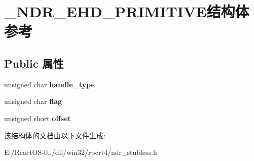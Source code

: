 \hypertarget{struct___n_d_r___e_h_d___p_r_i_m_i_t_i_v_e}{}\section{\+\_\+\+N\+D\+R\+\_\+\+E\+H\+D\+\_\+\+P\+R\+I\+M\+I\+T\+I\+V\+E结构体 参考}
\label{struct___n_d_r___e_h_d___p_r_i_m_i_t_i_v_e}
\subsection*{Public 属性}
\begin{DoxyCompactItemize}
\item 
\mbox{\label{struct___n_d_r___e_h_d___p_r_i_m_i_t_i_v_e_acfe30f4fefa57e6e75e4e15abf3e5ce1}} 
unsigned char {\bfseries handle\+\_\+type}
\item 
\mbox{\label{struct___n_d_r___e_h_d___p_r_i_m_i_t_i_v_e_ad34687e1c7d9169b174264b9da30914e}} 
unsigned char {\bfseries flag}
\item 
\mbox{\label{struct___n_d_r___e_h_d___p_r_i_m_i_t_i_v_e_a61fea17fca130226bdbe4dc85c9065a4}} 
unsigned short {\bfseries offset}
\end{DoxyCompactItemize}


该结构体的文档由以下文件生成\+:\begin{DoxyCompactItemize}
\item 
E\+:/\+React\+O\+S-\/0../dll/win32/rpcrt4/ndr\+\_\+stubless.\+h\end{DoxyCompactItemize}
